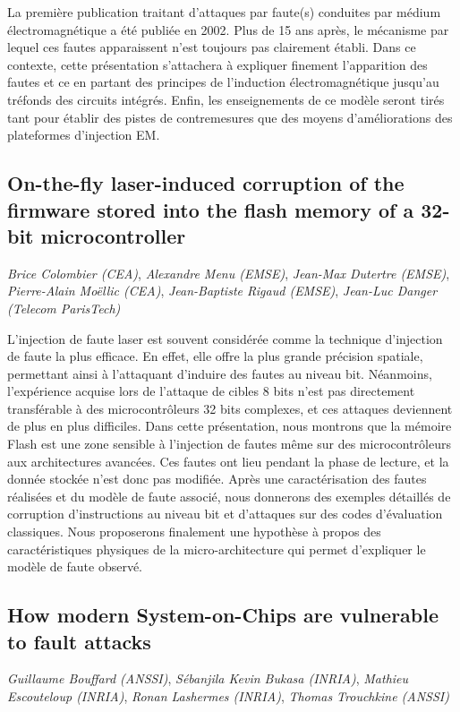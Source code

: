 \documentclass[a4paper,11pt]{article}
\begin{document}
La première publication traitant d’attaques par faute(s) conduites par
médium électromagnétique a été publiée en 2002. Plus de 15 ans après,
le mécanisme par lequel ces fautes apparaissent n’est toujours pas
clairement établi. Dans ce contexte, cette présentation s’attachera à
expliquer finement l’apparition des fautes et ce en partant des
principes de l’induction électromagnétique jusqu’au tréfonds des
circuits intégrés. Enfin, les enseignements de ce modèle seront tirés
tant pour établir des pistes de contremesures que des moyens
d’améliorations des plateformes d’injection EM.

\subsection{On-the-fly laser-induced corruption of the firmware stored into the flash memory of a 32-bit microcontroller}
\label{sec:orga260102}
\emph{Brice Colombier (CEA)}, \emph{Alexandre Menu (EMSE)}, \emph{Jean-Max Dutertre (EMSE)}, \emph{Pierre-Alain Moëllic (CEA)}, \emph{Jean-Baptiste Rigaud (EMSE)}, \emph{Jean-Luc Danger (Telecom ParisTech)}

 L'injection de faute laser est souvent considérée comme la
technique d'injection de faute la plus efficace. En effet, elle offre
la plus grande précision spatiale, permettant ainsi à l'attaquant
d'induire des fautes au niveau bit. Néanmoins, l'expérience acquise
lors de l'attaque de cibles 8 bits n'est pas directement transférable
à des microcontrôleurs 32 bits complexes, et ces attaques deviennent
de plus en plus difficiles. Dans cette présentation, nous montrons que
la mémoire Flash est une zone sensible à l'injection de fautes même
sur des microcontrôleurs aux architectures avancées. Ces fautes ont
lieu pendant la phase de lecture, et la donnée stockée n'est donc pas
modifiée. Après une caractérisation des fautes réalisées et du modèle
de faute associé, nous donnerons des exemples détaillés de corruption
d'instructions au niveau bit et d'attaques sur des codes d'évaluation
classiques. Nous proposerons finalement une hypothèse à propos des
caractéristiques physiques de la micro-architecture qui permet
d'expliquer le modèle de faute observé.

\subsection{How modern System-on-Chips are vulnerable to fault attacks}
\label{sec:orgc4c5702}
\emph{Guillaume Bouffard (ANSSI)}, \emph{Sébanjila Kevin Bukasa (INRIA)},
\emph{Mathieu Escouteloup (INRIA)}, \emph{Ronan Lashermes (INRIA)}, \emph{Thomas
Trouchkine (ANSSI)}
\end{document}
